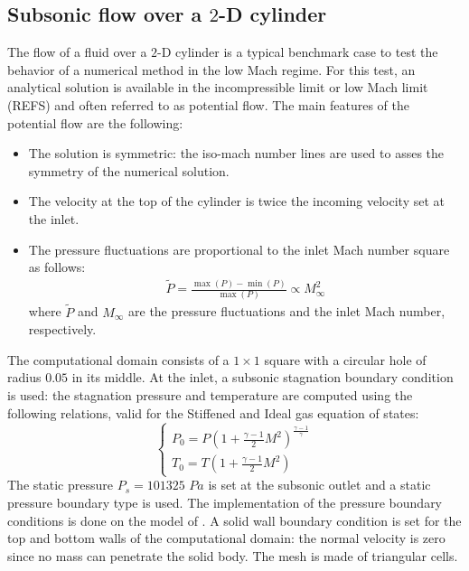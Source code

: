 \documentclass[preprint,10pt]{elsarticle}
\begin{document}
\subsection{Subsonic flow over a $2$-D cylinder} \label{sec:cylinder}
The flow of a fluid over a $2$-D cylinder is a typical benchmark case to test the behavior of a numerical method in the low Mach regime. For this test, an analytical solution is available in the incompressible limit or low Mach limit (REFS) and often referred to as potential flow. The main features of the potential flow are the following:
\begin{itemize}
\item The solution is symmetric: the iso-mach number lines are used to asses the symmetry of the numerical solution.
\item The velocity at the top of the cylinder is twice the incoming velocity set at the inlet.
\item The pressure fluctuations are proportional to the inlet Mach number square as follows: 
\begin{eqnarray}
\tilde{P} = \frac{\max(P) - \min(P)}{\max(P)}  \propto M_\infty^2\nonumber
\end{eqnarray}
where $\tilde{P}$ and $M_\infty$ are the pressure fluctuations and the inlet Mach number, respectively.
\end{itemize}
The computational domain consists of a $1\times 1$ square with a circular hole of radius $0.05$ in its middle. At the inlet, a subsonic stagnation boundary condition is used: the stagnation pressure and temperature are computed using the following relations, valid for the Stiffened and Ideal gas equation of states:
\begin{equation}
\label{eq:stagnation_relations}
\left\{
\begin{array}{l}
P_0 = P\left( 1 + \frac{\gamma-1}{2} M^2 \right)^{\frac{\gamma-1}{\gamma}} \\
T_0 = T\left( 1 + \frac{\gamma-1}{2} M^2 \right)
\end{array}
\right.
\end{equation}
The static pressure $P_s = 101325$ $Pa$ is set at the subsonic outlet and a static pressure boundary type is used. The implementation of the pressure boundary conditions is done on the model of \cite{SEM}. A solid wall boundary condition is set for the top and bottom walls of the computational domain: the normal velocity is zero since no mass can penetrate the solid body. The mesh is made of triangular cells.\\
\end{document}
